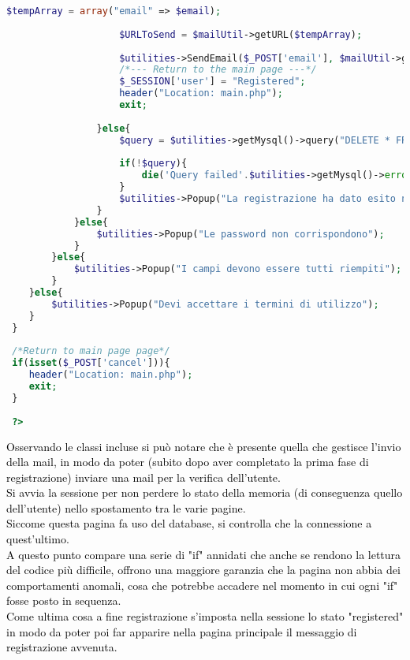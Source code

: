 \begin{lstlisting}[language=php]
 					$tempArray = array("email" => $email);
 					
 					$URLToSend = $mailUtil->getURL($tempArray);
 					
 					$utilities->SendEmail($_POST['email'], $mailUtil->getSubject(), $mailUtil->getBody($URLToSend), $mailUtil->getAlternativeBody($URLToSend));
 					/*--- Return to the main page ---*/
 					$_SESSION['user'] = "Registered";
 					header("Location: main.php");
 					exit;
 					
 				}else{
 					$query = $utilities->getMysql()->query("DELETE * FROM usert_table1 WHERE (email = '{$email}')");
 					
 					if(!$query){
 						die('Query failed'.$utilities->getMysql()->error);
 					} 
					$utilities->Popup("La registrazione ha dato esito negativo");
 				}
 			}else{
 				$utilities->Popup("Le password non corrispondono");
 			}
 		}else{
 			$utilities->Popup("I campi devono essere tutti riempiti");
 		}
 	}else{
 		$utilities->Popup("Devi accettare i termini di utilizzo");
 	}
 }
 
 /*Return to main page page*/
 if(isset($_POST['cancel'])){
 	header("Location: main.php");
 	exit;
 }
 
 ?>
 \end{lstlisting}
 
 \textcolor{black}{Osservando le classi incluse si può notare che è presente quella che gestisce l'invio della mail, in modo da poter (subito dopo aver completato la prima fase di registrazione) inviare una mail per la verifica dell'utente.\\
 Si avvia la sessione per non perdere lo stato della memoria (di conseguenza quello dell'utente) nello spostamento tra le varie pagine.\\
 Siccome questa pagina fa uso del database, si controlla che la connessione a quest'ultimo.\\
 A questo punto compare una serie di "if" annidati che anche se rendono la lettura del codice più difficile, offrono una maggiore garanzia che la pagina non abbia dei comportamenti anomali, cosa che potrebbe accadere nel momento in cui ogni "if" fosse posto in sequenza.\\
 Come ultima cosa a fine registrazione s'imposta nella sessione lo stato "registered" in modo da poter poi far apparire nella pagina principale il messaggio di registrazione avvenuta.}\\
 

